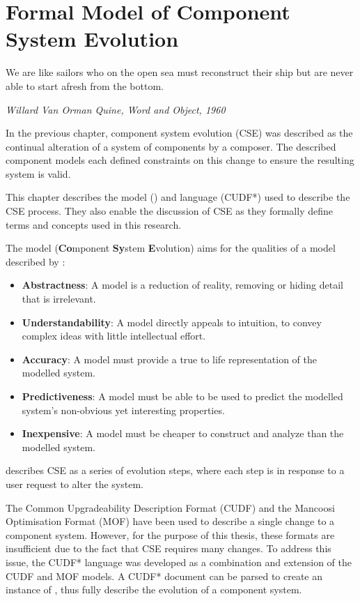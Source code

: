 \chapter{Formal Model of Component System Evolution}
\label{formal}
\epigraph{We are like sailors who on the open sea must reconstruct their ship but are never able to start afresh from the bottom.}
{\textit{Willard Van Orman Quine, Word and Object, 1960}}
In the previous chapter, component system evolution (CSE) was described as the continual alteration of a system of components by a composer.
The described component models each defined constraints on this change to ensure the resulting system is valid.

This chapter describes the model (\modelname) and language (CUDF*) used to describe the CSE process. 
They also enable the discussion of CSE as they formally define terms and concepts used in this research.

The model \modelname (\textbf{Co}mponent \textbf{Sy}stem \textbf{E}volution) aims for the qualities of a model described by \cite{Selic2003}:
\begin{itemize}
  \item \textbf{Abstractness}: A model is a reduction of reality, removing or hiding detail that is irrelevant.
  \item \textbf{Understandability}: A model directly appeals to intuition, to convey complex ideas with little intellectual effort.
  \item \textbf{Accuracy}: A model must provide a true to life representation of the modelled system.
  \item \textbf{Predictiveness}: A model must be able to be used to predict the modelled system's non-obvious yet interesting properties.
  \item \textbf{Inexpensive}: A model must be cheaper to construct and analyze than the modelled system.
\end{itemize}
\modelname describes CSE as a series of evolution steps, where each step is in response to a user request to alter the system. 

The Common Upgradeability Description Format (CUDF) \citep{treinen2009common} 
and the Mancoosi Optimisation Format (MOF) \citep{abate2011} have been used to describe a single change to a component system.
However, for the purpose of this thesis, these formats are insufficient due to the fact that CSE requires many changes.
To address this issue, the CUDF* language was developed as a combination and extension of the CUDF and MOF models.
A CUDF* document can be parsed to create an instance of \modelname, thus fully describe the evolution of a component system.

